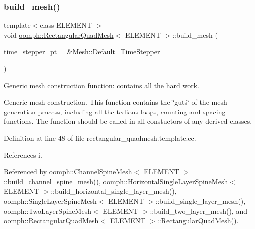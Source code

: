 \subsubsection{\texorpdfstring{build\+\_\+mesh()}{build\_mesh()}}
{\footnotesize\ttfamily template$<$class E\+L\+E\+M\+E\+NT $>$ \\
void \hyperlink{classoomph_1_1RectangularQuadMesh}{oomph\+::\+Rectangular\+Quad\+Mesh}$<$ E\+L\+E\+M\+E\+NT $>$\+::build\+\_\+mesh (\begin{DoxyParamCaption}\item[{\hyperlink{classoomph_1_1TimeStepper}{Time\+Stepper} $\ast$}]{time\+\_\+stepper\+\_\+pt = {\ttfamily \&\hyperlink{classoomph_1_1Mesh_a12243d0fee2b1fcee729ee5a4777ea10}{Mesh\+::\+Default\+\_\+\+Time\+Stepper}} }\end{DoxyParamCaption})\hspace{0.3cm}{\ttfamily [protected]}}



Generic mesh construction function\+: contains all the hard work. 

Generic mesh construction. This function contains the \char`\"{}guts\char`\"{} of the mesh generation process, including all the tedious loops, counting and spacing functions. The function should be called in all constuctors of any derived classes. 

Definition at line 48 of file rectangular\+\_\+quadmesh.\+template.\+cc.



References i.



Referenced by oomph\+::\+Channel\+Spine\+Mesh$<$ E\+L\+E\+M\+E\+N\+T $>$\+::build\+\_\+channel\+\_\+spine\+\_\+mesh(), oomph\+::\+Horizontal\+Single\+Layer\+Spine\+Mesh$<$ E\+L\+E\+M\+E\+N\+T $>$\+::build\+\_\+horizontal\+\_\+single\+\_\+layer\+\_\+mesh(), oomph\+::\+Single\+Layer\+Spine\+Mesh$<$ E\+L\+E\+M\+E\+N\+T $>$\+::build\+\_\+single\+\_\+layer\+\_\+mesh(), oomph\+::\+Two\+Layer\+Spine\+Mesh$<$ E\+L\+E\+M\+E\+N\+T $>$\+::build\+\_\+two\+\_\+layer\+\_\+mesh(), and oomph\+::\+Rectangular\+Quad\+Mesh$<$ E\+L\+E\+M\+E\+N\+T $>$\+::\+Rectangular\+Quad\+Mesh().

\mbox{\label{classoomph_1_1RectangularQuadMesh_ae1e1d67808d4efb6e16a3835162a4504}} 
